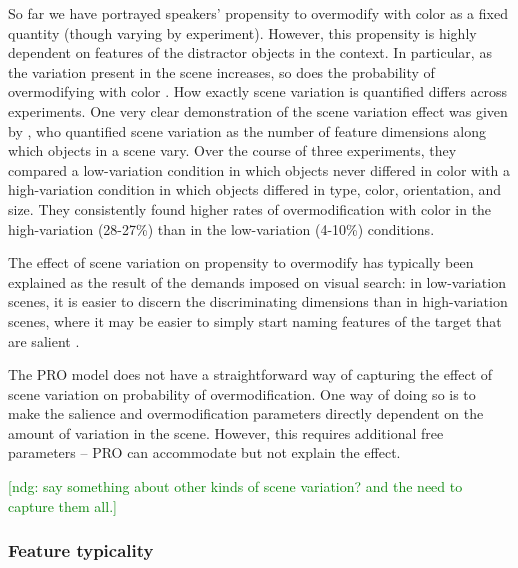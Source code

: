 \documentclass[11pt]{article}
\newcommand{\ndg}[1]{\textcolor{Green}{[ndg: #1]}}
\newcommand{\sectionref}[1]{Section \ref{#1}}
\begin{document}
So far we have portrayed speakers' propensity to overmodify with color as a fixed quantity (though varying by experiment). However, this propensity is highly dependent on features of the distractor objects in the context. In particular, as the variation present in the scene increases, so does the probability of overmodifying with color \cite{Davies2013, Koolen2013}. How exactly scene variation is quantified differs across experiments. One very clear demonstration of the scene variation effect was given by , who quantified scene variation as the number of feature dimensions along which objects in a scene vary. Over the course of three experiments, they compared a low-variation condition in which objects never differed in color with a high-variation condition in which objects differed in type, color, orientation, and size. They consistently found higher rates of overmodification with color in the high-variation (28-27\%) than in the low-variation (4-10\%) conditions.

The effect of scene variation on propensity to overmodify has typically been explained as the result of the demands imposed on visual search: in low-variation scenes, it is easier to discern the discriminating dimensions than in high-variation scenes, where it may be easier to simply start naming features of the target that are salient \cite{Koolen2013}. 

The PRO model does not have a straightforward way of capturing the effect of scene variation on probability of overmodification. One way of doing so is to make the salience and overmodification parameters directly dependent on the amount of variation in the scene. However, this requires additional free parameters -- PRO can accommodate but not explain the effect.

\ndg{say something about other kinds of scene variation? and the need to capture them all.}


\subsubsection{Feature typicality}
\label{sec:colortypicalityintro}
\end{document}
